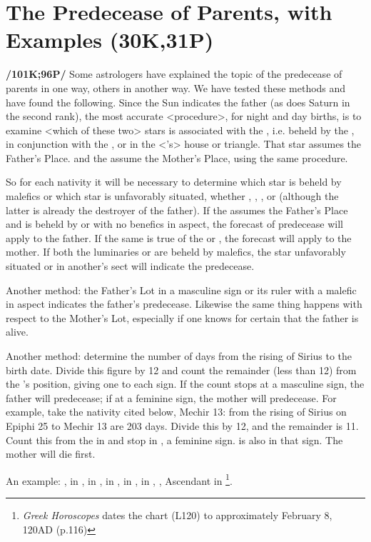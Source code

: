 \section{The Predecease of Parents, with Examples (30K,31P)}

\textbf{/101K;96P/} Some astrologers have explained the topic of the predecease of parents in one way, others in another
way. We have tested these methods and have found the following. Since the Sun indicates the father (as does Saturn in the second rank), the most accurate <procedure>, for night and day births, is to examine
<which of these two> stars is associated  with the \Moon, i.e. beheld by the \Moon, in conjunction with the \Moon, or in the <\Moon’s> house or triangle. That star assumes the Father’s Place. \Venus\xspace and the \Moon\xspace assume the Mother’s Place, using the same procedure. 

So for each nativity it will be necessary to determine which star is beheld by malefics or which star is unfavorably situated, whether \Sun, \Moon, \Venus, or \Saturn\xspace (although the latter is already the destroyer of the father). If the \Sun\xspace assumes the Father’s Place and is beheld by \Mars\xspace or \Saturn\xspace with no benefics in aspect, the forecast of predecease will apply to the father. If the same is true of the \Moon\xspace or \Venus, the forecast will apply to the mother. If both the luminaries or \Venus\xspace are beheld by malefics, the star unfavorably situated or in another’s sect will indicate the predecease.

Another method: the Father’s Lot in a masculine sign or its ruler with a malefic in aspect indicates the father’s predecease. Likewise the same thing happens with respect to the Mother’s Lot, especially if one knows for certain that the father is alive.

Another method: determine the number of days from the rising of Sirius to the birth date. Divide this figure by 12 and count the remainder (less than 12) from the \Moon’s position, giving one to each sign. If the count stops at a masculine sign, the father will predecease; if at a feminine sign, the mother will
predecease. For example, take the nativity cited below, Mechir 13: from the rising of Sirius on Epiphi 25 to Mechir 13 are 203 days. Divide this by 12, and the remainder is 11. Count this from the \Moon\xspace in \Scorpio\xspace and stop in \Virgo, a feminine sign. \Mars\xspace is also in that sign. The mother will die first.

An example: \Sun, \Mercury\xspace in \Aquarius, \Moon\xspace in \Scorpio, \Saturn\xspace in \Cancer, \Jupiter\xspace in \Libra, \Venus\xspace in \Capricorn, \Mars, Ascendant in \Virgo
\footnote{\textit{Greek Horoscopes} dates the chart (L120) to approximately February 8, 120AD (p.116)}.

